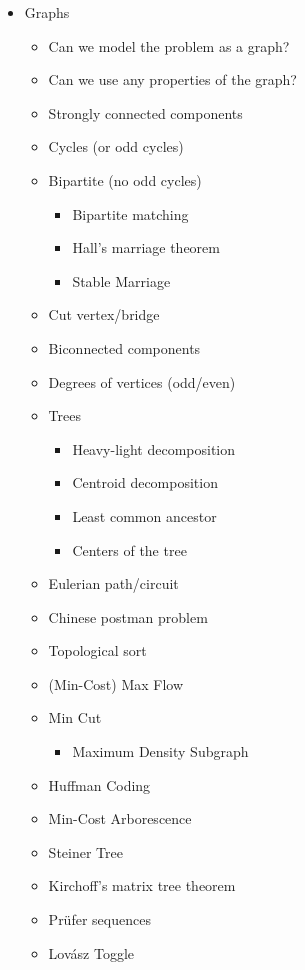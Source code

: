 \documentclass[9pt,a4paper,landscape,oneside]{amsart}
\newenvironment{myitemize}
{\begin{itemize}[leftmargin=.3cm]
	\setlength{\itemsep}{0pt}
	\setlength{\parskip}{0pt}
	\setlength{\parsep}{0pt}     }
{ \end{itemize}                  }
\begin{document}
\begin{multicols*}{3}
\begin{myitemize}
\begin{myitemize}
			\item Generating functions
		\end{myitemize}
	\item Graphs
		\begin{myitemize}
			\item Can we model the problem as a graph?
			\item Can we use any properties of the graph?
			\item Strongly connected components
			\item Cycles (or odd cycles)
			\item Bipartite (no odd cycles)
				\begin{myitemize}
					\item Bipartite matching
					\item Hall's marriage theorem
					\item Stable Marriage
				\end{myitemize}
			\item Cut vertex/bridge
			\item Biconnected components
			\item Degrees of vertices (odd/even)
			\item Trees
				\begin{myitemize}
					\item Heavy-light decomposition
					\item Centroid decomposition
					\item Least common ancestor
					\item Centers of the tree
				\end{myitemize}
			\item Eulerian path/circuit
			\item Chinese postman problem
			\item Topological sort
			\item (Min-Cost) Max Flow
			\item Min Cut
				\begin{myitemize}
					\item Maximum Density Subgraph
				\end{myitemize}
			\item Huffman Coding
			\item Min-Cost Arborescence
			\item Steiner Tree
			\item Kirchoff's matrix tree theorem
			\item Pr\"ufer sequences
			\item Lov\'asz Toggle

\end{myitemize}
\end{myitemize}
\end{multicols*}
\end{document}
